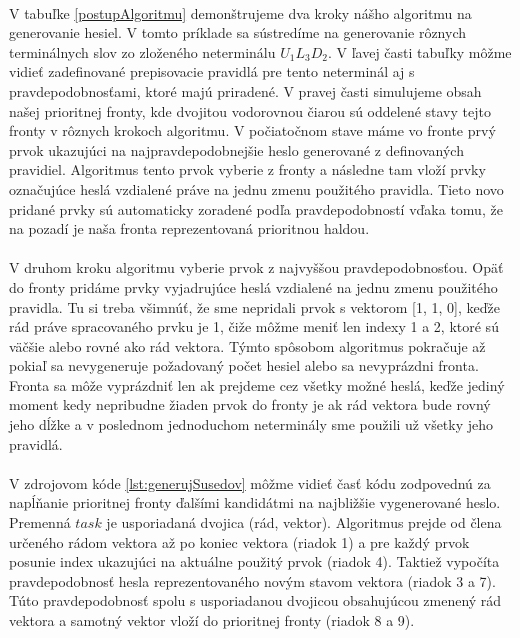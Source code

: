 \paragraph{}
V tabuľke \ref{postupAlgoritmu} demonštrujeme dva kroky nášho algoritmu na generovanie hesiel. V tomto príklade sa sústredíme na generovanie rôznych terminálnych slov zo zloženého neterminálu \(U_1L_3D_2\). V ľavej časti tabuľky môžme vidieť zadefinované prepisovacie pravidlá pre tento neterminál aj s pravdepodobnosťami, ktoré majú priradené. V pravej časti simulujeme obsah našej prioritnej fronty, kde dvojitou vodorovnou čiarou sú oddelené stavy tejto fronty v rôznych krokoch algoritmu. V počiatočnom stave máme vo fronte prvý prvok ukazujúci na najpravdepodobnejšie heslo generované z definovaných pravidiel. Algoritmus tento prvok vyberie z fronty a následne tam vloží prvky označujúce heslá vzdialené práve na jednu zmenu použitého pravidla. Tieto novo pridané prvky sú automaticky zoradené podľa pravdepodobností vďaka tomu, že na pozadí je naša fronta reprezentovaná prioritnou haldou. 

\paragraph{}
V druhom kroku algoritmu vyberie prvok z najvyššou pravdepodobnosťou. Opäť do fronty pridáme prvky vyjadrujúce heslá vzdialené na jednu zmenu použitého pravidla. Tu si treba všimnúť, že sme nepridali prvok s vektorom [1, 1, 0], keďže rád práve spracovaného prvku je 1, čiže môžme meniť len indexy 1 a 2, ktoré sú väčšie alebo rovné ako rád vektora. Týmto spôsobom algoritmus pokračuje až pokiaľ sa nevygeneruje požadovaný počet hesiel alebo sa nevyprázdni fronta. Fronta sa môže vyprázdniť len ak prejdeme cez všetky možné heslá, keďže jediný moment kedy nepribudne žiaden prvok do fronty je ak rád vektora bude rovný jeho dĺžke a v poslednom jednoduchom neterminály sme použili už všetky jeho pravidlá.

\paragraph{}
V zdrojovom kóde \ref{lst:generujSusedov} môžme vidieť časť kódu zodpovednú za napĺňanie prioritnej fronty ďalšími kandidátmi na najbližšie vygenerované heslo. Premenná \(task\) je usporiadaná dvojica (rád, vektor). Algoritmus prejde od člena určeného rádom vektora až po koniec vektora (riadok 1) a pre každý prvok posunie index ukazujúci na aktuálne použitý prvok (riadok 4). Taktiež vypočíta pravdepodobnosť hesla reprezentovaného novým stavom vektora (riadok 3 a 7). Túto pravdepodobnosť spolu s usporiadanou dvojicou obsahujúcou zmenený rád vektora a samotný vektor vloží do prioritnej fronty (riadok 8 a 9).

